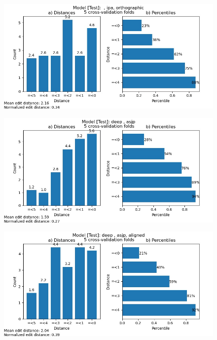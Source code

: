\begin{figure}
    \centering
    \includegraphics[width=\textwidth]{deep_test_ipa_ortho.jpg}
    \label{fig:sdtio}
\end{figure}

\begin{figure}
    \centering
    \includegraphics[width=\textwidth]{deep_test_asjp.jpg}
    \label{fig:sdta}
\end{figure}

\begin{figure}
    \centering
    \includegraphics[width=\textwidth]{deep_test_asjp_aligned.jpg}
    \label{fig:sdtaa}
\end{figure}

